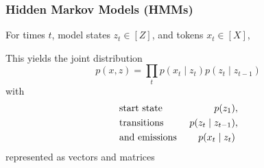 \documentclass{beamer}
\begin{document}
\begin{frame}
\frametitle{Hidden Markov Models (HMMs)}

For times $t$, model states $z_t \in [Z]$, and tokens $x_t \in [X]$,

\begin{center}
\end{center}

This yields the joint distribution
$$p(x,z) = \prod_t p(x_t \mid z_t)p(z_t \mid z_{t-1})$$
%
with 
\begin{align*}
&\textnormal{start state } & p(z_1)&,\\
&\textnormal{transitions } & p(z_t \mid z_{t-1})&,\\
&\textnormal{and emissions } &  p(x_t \mid z_t)&
\end{align*}
represented as vectors and matrices

\end{frame}
\end{document}
